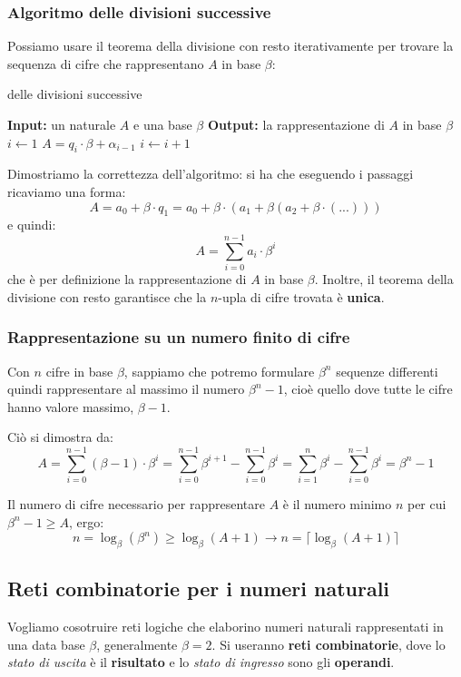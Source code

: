 \documentclass[a4paper,11pt]{article}
\begin{document}
\subsubsection{Algoritmo delle divisioni successive}
Possiamo usare il teorema della divisione con resto iterativamente per trovare la sequenza di cifre che rappresentano $A$ in base $\beta$:
\begin{algorithm}[H]
\caption{delle divisioni successive}
\begin{algorithmic}
	\STATE \textbf{Input:} un naturale $A$ e una base $\beta$ %
	\STATE \textbf{Output:} la rappresentazione di $A$ in base $\beta$ %
	\STATE$i \leftarrow 1$
		\STATE $A = q_i \cdot \beta + \alpha_{i-1}$
		\STATE $i \leftarrow i + 1$
	\ENDWHILE
\end{algorithmic}
\end{algorithm}

Dimostriamo la correttezza dell'algoritmo: si ha che eseguendo i passaggi ricaviamo una forma:
$$ 
A = a_0 + \beta \cdot q_1 = a_0 + \beta \cdot (a_1 + \beta (a_2 + \beta \cdot (...)))
$$
e quindi:
$$ 
A = \sum_{i=0}^{n-1} a_i \cdot \beta^i
$$
che è per definizione la rappresentazione di $A$ in base $\beta$.
Inoltre, il teorema della divisione con resto garantisce che la $n$-upla di cifre trovata è \textbf{unica}.

\subsubsection{Rappresentazione su un numero finito di cifre}
Con $n$ cifre in base $\beta$, sappiamo che potremo formulare $\beta^n$ sequenze differenti quindi rappresentare al massimo il numero $\beta^n - 1$, cioè quello dove tutte le cifre hanno valore massimo, $\beta - 1$.

Ciò si dimostra da:
$$
A = \sum_{i=0}^{n-1} (\beta - 1) \cdot \beta^i = \sum_{i=0}^{n-1} \beta^{i + 1} - \sum_{i=0}^{n-1} \beta^i = \sum_{i=1}^{n} \beta^{i} - \sum_{i=0}^{n-1} \beta^i  = \beta^n - 1 $$

Il numero di cifre necessario per rappresentare $A$ è il numero minimo $n$ per cui $\beta^n - 1 \geq A$, ergo:
$$
n = \log_\beta (\beta^n) \geq \log_\beta (A + 1) \rightarrow n = \lceil \log_\beta (A + 1) \rceil
$$

\subsection{Reti combinatorie per i numeri naturali}
Vogliamo cosotruire reti logiche che elaborino numeri naturali rappresentati in una data base $\beta$, generalmente $\beta = 2$.
Si useranno \textbf{reti combinatorie}, dove lo \textit{stato di uscita} è il \textbf{risultato} e lo \textit{stato di ingresso} sono gli \textbf{operandi}.
\end{document}
